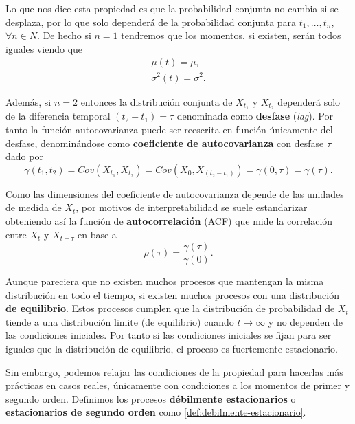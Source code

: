 Lo que nos dice esta propiedad es que la probabilidad conjunta no cambia si se desplaza, por lo que solo dependerá de la probabilidad conjunta para $t_1, \ldots, t_n$, $\forall n \in N$. De hecho si $n=1$ tendremos que los momentos, si existen, serán todos iguales viendo que
\begin{gather*}
  \mu(t) = \mu, \\
  \sigma^2(t) = \sigma^2.
  \label{eq:estricto-momentos}
\end{gather*}

Además, si $n = 2$ entonces la distribución conjunta de $X_{t_1}$ y $X_{t_2}$ dependerá solo de la diferencia temporal $(t_2 - t_1) = \tau$ denominada como \textbf{desfase} (\emph{lag}). Por tanto la función autocovarianza puede ser reescrita en función únicamente del desfase, denominándose como \textbf{coeficiente de autocovarianza} con desfase $\tau$ dado por
\begin{equation*}
  \gamma(t_1, t_2) = Cov(X_{t_1}, X_{t_2}) = Cov(X_{0}, X_{(t_2 - t_1)}) = \gamma(0, \tau) = \gamma(\tau).
  \label{eq:estricto-autocovarianza}
\end{equation*}

Como las dimensiones del coeficiente de autocovarianza depende de las unidades de medida de $X_t$, por motivos de interpretabilidad se suele estandarizar obteniendo así la función de \textbf{autocorrelación} (ACF) que mide la correlación entre $X_t$ y $X_{t + \tau}$ en base a
\begin{equation}
  \rho(\tau) = \dfrac{\gamma(\tau)}{\gamma(0)}.
  \label{eq:autocorrelacion}
\end{equation}

Aunque pareciera que no existen muchos procesos que mantengan la misma distribución en todo el tiempo, si existen muchos procesos con una distribución \textbf{de equilibrio}. Estos procesos cumplen que la distribución de probabilidad de $X_t$ tiende a una distribución limite (de equilibrio) cuando $t \to \infty$ y no dependen de las condiciones iniciales. Por tanto si las condiciones iniciales se fijan para ser iguales que la distribución de equilibrio, el proceso es fuertemente estacionario.

Sin embargo, podemos relajar las condiciones de la propiedad para hacerlas más prácticas en casos reales, únicamente con condiciones a los momentos de primer y segundo orden. Definimos los procesos \textbf{débilmente estacionarios} o \textbf{estacionarios de segundo orden} como \autoref{def:debilmente-estacionario}.

